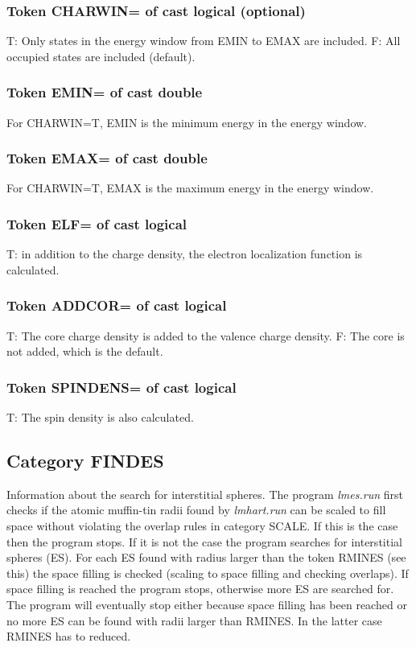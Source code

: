 \documentclass[aps,twocolumn,a4]{revtex4}
\begin{document}
\subsubsection{Token CHARWIN= of cast logical (optional)}
T: Only states in the energy window from EMIN to EMAX
are included.  F: All occupied states are included (default).

\subsubsection{Token EMIN= of cast double}
For CHARWIN=T, EMIN is the minimum energy in the energy window.

\subsubsection{Token EMAX= of cast double}
For CHARWIN=T, EMAX is the maximum energy in the energy window.

\subsubsection{Token ELF= of cast logical}
T: in addition to the charge density, the electron
localization function is calculated.

\subsubsection{Token ADDCOR= of cast logical}
T: The core charge density is added to the valence charge density. F:
The core is not added, which is the default.

\subsubsection{Token SPINDENS= of cast logical}
T: The spin density is also calculated.

\subsection{Category FINDES}
Information about the search for interstitial spheres. The program
{\em lmes.run} first checks if the atomic muffin-tin radii found by
{\em lmhart.run} can be scaled to fill space without violating the
overlap rules in category SCALE. If this is the case then the program
stops. If it is not the case the program searches for interstitial
spheres (ES). For each ES found with radius larger than the token RMINES
(see this) the space filling is checked (scaling to space filling and
checking overlaps). If space filling is reached the program stops,
otherwise more ES are searched for. The program will eventually stop 
either because space filling has been reached or no more ES can be
found with radii larger than RMINES. In the latter case RMINES has to
reduced.
\end{document}
